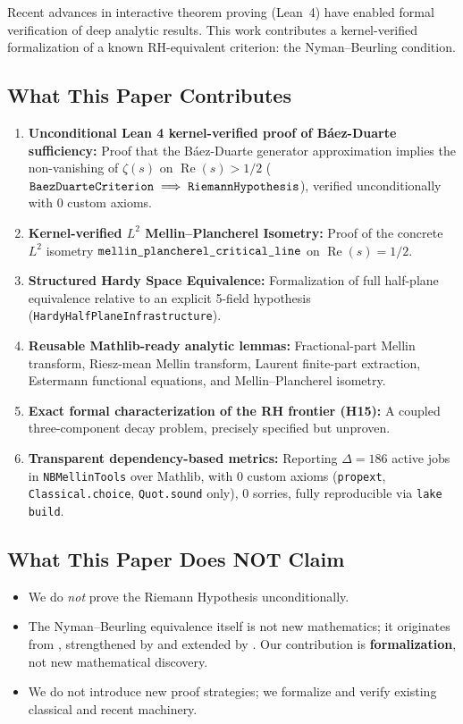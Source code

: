 \documentclass[11pt,a4paper]{article}
\theoremstyle{plain}
\theoremstyle{definition}
\theoremstyle{remark}
\DeclareMathOperator{\RePart}{Re}
\renewcommand{\Re}{\RePart}
\begin{document}
Recent advances in interactive theorem proving (Lean~4) \cite{MouraUllrich2021} have enabled formal verification of deep analytic results. This work contributes a kernel-verified formalization of a known RH-equivalent criterion: the Nyman--Beurling condition.

\subsection{What This Paper Contributes}

\begin{enumerate}[label=\textbf{\arabic*.}]
  \item \textbf{Unconditional Lean 4 kernel-verified proof of Báez-Duarte sufficiency:} Proof that the B\'aez-Duarte generator approximation implies the non-vanishing of $\zeta(s)$ on $\Re(s) > 1/2$ ($\text{\texttt{BaezDuarteCriterion}} \implies \text{\texttt{RiemannHypothesis}}$), verified unconditionally with 0 custom axioms.
  \item \textbf{Kernel-verified $L^2$ Mellin--Plancherel Isometry:} Proof of the concrete $L^2$ isometry $\text{\texttt{mellin\_plancherel\_critical\_line}}$ on $\Re(s) = 1/2$.
  \item \textbf{Structured Hardy Space Equivalence:} Formalization of full half-plane equivalence relative to an explicit 5-field hypothesis (\texttt{HardyHalfPlaneInfrastructure}).
  \item \textbf{Reusable Mathlib-ready analytic lemmas:} Fractional-part Mellin transform, Riesz-mean Mellin transform, Laurent finite-part extraction, Estermann functional equations, and Mellin--Plancherel isometry.
  \item \textbf{Exact formal characterization of the RH frontier (H15):} A coupled three-component decay problem, precisely specified but unproven.
  \item \textbf{Transparent dependency-based metrics:} Reporting $\Delta = 186$ active jobs in \texttt{NBMellinTools} over Mathlib, with 0 custom axioms (\texttt{propext}, \texttt{Classical.choice}, \texttt{Quot.sound} only), 0 sorries, fully reproducible via \texttt{lake build}.
\end{enumerate}

\subsection{What This Paper Does NOT Claim}

\begin{itemize}[leftmargin=2em]
  \item We do \emph{not} prove the Riemann Hypothesis unconditionally.
  \item The Nyman--Beurling equivalence itself is not new mathematics; it originates from \cite{Nyman1950,Beurling1955}, strengthened by \cite{BaezDuarte2003} and extended by \cite{BettinConreyFarmer2020}. Our contribution is \textbf{formalization}, not new mathematical discovery.
  \item We do not introduce new proof strategies; we formalize and verify existing classical and recent machinery.
\end{itemize}
\end{document}
